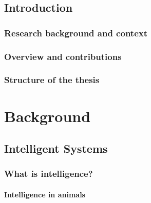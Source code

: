 \documentclass[12pt,a4paper,openright,twoside]{book}
\begin{document}
\chapter{Introduction}
\label{ch:introduction}

\section{Research background and context}\label{sec:research-background-and-context}

\section{Overview and contributions}\label{sec:overview-and-contributions}

\section{Structure of the thesis}\label{sec:structure-of-the-thesis}


\part{Background}\label{part:background}


\chapter{Intelligent Systems}\label{ch:intelligent-systems}

\section{What is intelligence?}\label{sec:what-is-intelligence}

\subsection{Intelligence in animals}\label{subsec:intelligence-in-animals}
\end{document}
